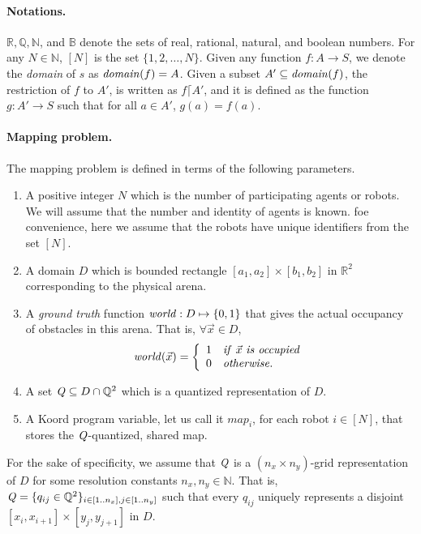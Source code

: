 \paragraph{Notations.}
$\mathbb{R}, \mathbb{Q},\mathbb{N}$, and $\mathbb{B}$ denote the sets of real, rational, natural, and boolean numbers.
For any $N \in \mathbb{N}$, $[N]$ is the set $\{1,2,\ldots,N\}$.
%
Given any function $f:A \rightarrow S$, we denote the {\em domain\/} of $s$ as $\mathit{domain}(f) = A$.
%
Given a subset $A' \subseteq \mathit{domain}(f)$, 
    the restriction of $f$ to $A'$, is written as $f \lceil A'$, and it is defined as the function $g:A' \rightarrow S$ such that for all $a \in A'$, $g(a) = f(a)$.

\paragraph{Mapping problem.}
The mapping problem is defined in terms of the following parameters.
\begin{enumerate}
	\item A positive integer $N$ which is the number of participating agents or robots. We will assume that the number and identity of agents is known. foe convenience, here we assume that the robots have unique identifiers from the set $[N]$.
	\item A domain $D$ which is bounded rectangle $[a_1,a_2]\times [b_1,b_2]$ in $\mathbb{R}^2$ corresponding to the physical arena.
	\item A \emph{ground truth} function $\mathit{world} : D\mapsto \left\{0,1\right\}$ that gives the actual  occupancy of obstacles in this arena. That is, $\forall \Vec{x} \in D$, 
\begin{align}
\mathit{world}(\Vec{x}) = 
		\left\{
		\begin{array}{ll}
			1 & \mathit{if}\ \Vec{x} \ \mathit{is \ occupied}\\
			0 & \mathit{otherwise}.
		\end{array}
		\right.
\end{align}
	\item A set $\mathit{Q} \subseteq D \cap \mathbb{Q}^2$ which is a quantized representation of $D$.
	\item A Koord program variable, let us call it $\mathit{map}_i$, for each robot $i \in [N]$, that stores the $\mathit{Q}$-quantized, shared map.
\end{enumerate}
For the sake of specificity, we assume that $\mathit{Q}$ is a $(n_x\times n_y)$-grid representation of $D$ for some resolution constants $n_x,n_y \in \mathbb{N}$. That is, $\mathit{Q} = \{q_{ij} \in \mathbb{Q}^2\}_{i\in [1..n_x], j\in [1..n_y]}$ such that every $q_{ij}$ uniquely represents a disjoint $[x_i, x_{i+1}] \times [y_j, y_{j+1}]$ in $D$.
